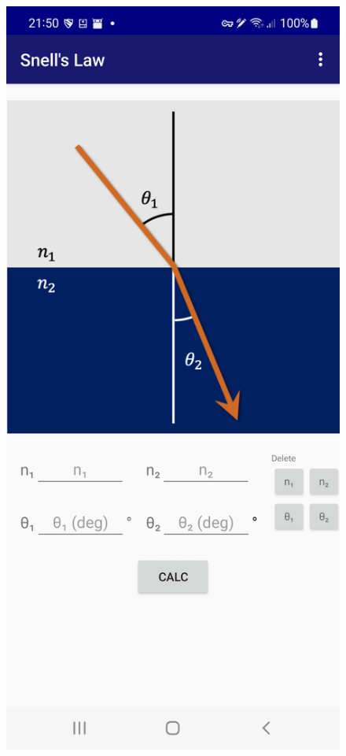 \documentclass[12pt,a4paper]{article}
\begin{document}
\begin{multicols}{2}
	\begin{figure}
		\centering
		\includegraphics{Snell_s-Law.jpg}
	\end{figure}
\columnbreak


\end{multicols}
\end{document}
